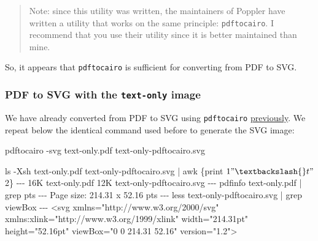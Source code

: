\documentclass[
  a4paper,
]{article}
\newenvironment{Shaded}{\begin{snugshade}}{\end{snugshade}}
\newcommand{\AttributeTok}[1]{\textcolor[rgb]{0.80,0.80,0.80}{#1}}
\newcommand{\ExtensionTok}[1]{\textcolor[rgb]{0.80,0.80,0.80}{#1}}
\newcommand{\FunctionTok}[1]{\textcolor[rgb]{0.94,0.94,0.56}{#1}}
\newcommand{\KeywordTok}[1]{\textcolor[rgb]{0.94,0.87,0.69}{#1}}
\newcommand{\NormalTok}[1]{\textcolor[rgb]{0.80,0.80,0.80}{#1}}
\newcommand{\OperatorTok}[1]{\textcolor[rgb]{0.94,0.94,0.82}{#1}}
\newcommand{\StringTok}[1]{\textcolor[rgb]{0.80,0.58,0.58}{#1}}
\newcommand{\VariableTok}[1]{\textcolor[rgb]{0.80,0.80,0.80}{#1}}
\begin{document}
\begin{quote}
Note: since this utility was written, the maintainers of Poppler have
written a utility that works on the same principle: \texttt{pdftocairo}.
I recommend that you use their utility since it is better maintained
than mine.
\end{quote}

So, it appears that \texttt{pdftocairo} is sufficient for converting
from PDF to SVG.

\hypertarget{pdf-to-svg-with-the-text-only-image}{%
\subsubsection{\texorpdfstring{PDF to SVG with the \texttt{text-only}
image}{PDF to SVG with the text-only image}}\label{pdf-to-svg-with-the-text-only-image}}

We have already converted from PDF to SVG using \texttt{pdftocairo}
\protect\hyperlink{generating-an-svg-from-a-pdf}{previously}. We repeat
below the identical command used before to generate the SVG image:

\begin{Shaded}
\begin{Highlighting}[]
\ExtensionTok{pdftocairo} \AttributeTok{{-}svg}\NormalTok{ text{-}only.pdf text{-}only{-}pdftocairo.svg}

\FunctionTok{ls} \AttributeTok{{-}Xsh}\NormalTok{ text{-}only.pdf text{-}only{-}pdftocairo.svg }\KeywordTok{|} \FunctionTok{awk} \StringTok{\textquotesingle{}\{print $1 "\textbackslash{}t" $2\}\textquotesingle{}}
\ExtensionTok{{-}{-}{-}}
\ExtensionTok{16K}\NormalTok{     text{-}only.pdf}
\ExtensionTok{12K}\NormalTok{     text{-}only{-}pdftocairo.svg}
\ExtensionTok{{-}{-}{-}}
\ExtensionTok{pdfinfo}\NormalTok{ text{-}only.pdf }\KeywordTok{|} \FunctionTok{grep}\NormalTok{ pts}
\ExtensionTok{{-}{-}{-}}
\ExtensionTok{Page}\NormalTok{ size:      214.31 x 52.16 pts}
\ExtensionTok{{-}{-}{-}}
\FunctionTok{less}\NormalTok{ text{-}only{-}pdftocairo.svg }\KeywordTok{|} \FunctionTok{grep}\NormalTok{ viewBox}
\ExtensionTok{{-}{-}{-}}
\OperatorTok{\textless{}}\NormalTok{svg }\VariableTok{xmlns}\OperatorTok{=}\StringTok{"http://www.w3.org/2000/svg"} \ExtensionTok{xmlns:xlink=}\StringTok{"http://www.w3.org/1999/xlink"}\NormalTok{ width=}\StringTok{"214.31pt"}\NormalTok{ height=}\StringTok{"52.16pt"}\NormalTok{ viewBox=}\StringTok{"0 0 214.31 52.16"}\NormalTok{ version=}\StringTok{"1.2"}\OperatorTok{\textgreater{}}
\end{Highlighting}
\end{Shaded}
\end{document}
